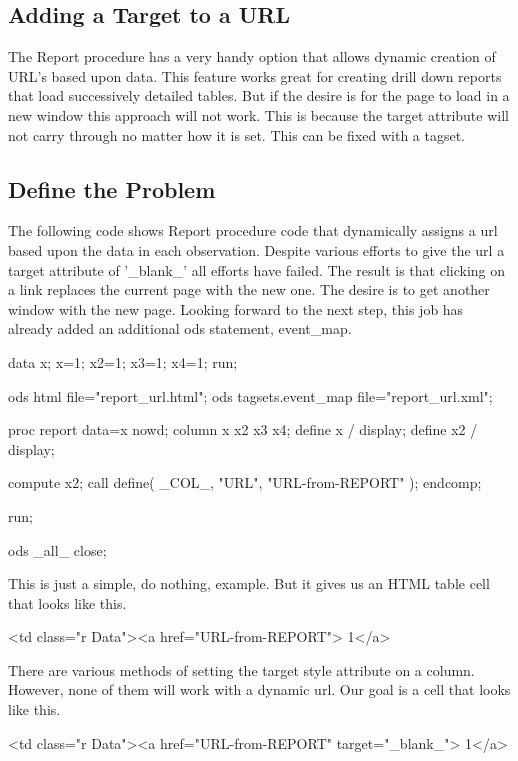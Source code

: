 \subsection{Adding a Target to a URL}
The Report procedure has a very handy option that allows dynamic creation
of URL's based upon data.  This feature works great for creating drill down
reports that load successively detailed tables.  But if the desire is for 
the page to load in a new window this approach will not work. This is because the 
target attribute will not carry through no matter how it is set.  This can 
be fixed with a tagset.

\subsection{Define the Problem}
The following code shows Report procedure code that dynamically assigns
a url based upon the data in each observation.  Despite various efforts
to give the url a target attribute of '\_blank\_' all efforts have failed.
The result is that clicking on a link replaces the current page with the
new one.  The desire is to get another window with the new page.
Looking forward to the next step, this job has already added an additional ods
statement, event\_map.

\begin{sfvcode}
data x; x=1; x2=1; x3=1; x4=1; run;

ods html file="report_url.html";
ods tagsets.event_map file="report_url.xml";

proc report data=x nowd;
  column x x2 x3 x4;
  define x / display;
  define x2 / display;

  compute x2;
    call define( _COL_, "URL", "URL-from-REPORT" );
    endcomp;

  run;

ods _all_ close;
\end{sfvcode}

This is just a simple, do nothing, example.  But it gives us an HTML table
cell that looks like this.

\begin{sfvoutput} 
<td class="r Data"><a href="URL-from-REPORT">        1</a>
\end{sfvoutput} 

There are various methods of setting the target style attribute on a column.
However, none of them will work with a dynamic url. Our goal is a cell that
looks like this.

\begin{sfvoutput} 
<td class="r Data"><a href="URL-from-REPORT" target="_blank_">        1</a>
\end{sfvoutput} 

